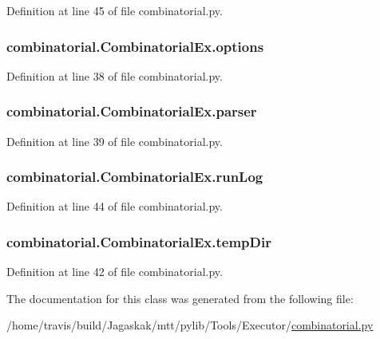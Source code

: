 Definition at line 45 of file combinatorial.\-py.

\hypertarget{classcombinatorial_1_1CombinatorialEx_a20eda525b3947495bb6084c560dcca27}{
\subsubsection[{options}]{\setlength{\rightskip}{0pt plus 5cm}combinatorial.\-Combinatorial\-Ex.\-options}}\label{classcombinatorial_1_1CombinatorialEx_a20eda525b3947495bb6084c560dcca27}


Definition at line 38 of file combinatorial.\-py.

\hypertarget{classcombinatorial_1_1CombinatorialEx_ab5c27fece8991a34f47e85870637fc91}{
\subsubsection[{parser}]{\setlength{\rightskip}{0pt plus 5cm}combinatorial.\-Combinatorial\-Ex.\-parser}}\label{classcombinatorial_1_1CombinatorialEx_ab5c27fece8991a34f47e85870637fc91}


Definition at line 39 of file combinatorial.\-py.

\hypertarget{classcombinatorial_1_1CombinatorialEx_a3de3f7da4c201525da8452258df0bc7b}{
\subsubsection[{run\-Log}]{\setlength{\rightskip}{0pt plus 5cm}combinatorial.\-Combinatorial\-Ex.\-run\-Log}}\label{classcombinatorial_1_1CombinatorialEx_a3de3f7da4c201525da8452258df0bc7b}


Definition at line 44 of file combinatorial.\-py.

\hypertarget{classcombinatorial_1_1CombinatorialEx_a24b3bc621a8380e406bade192bc371d4}{
\subsubsection[{temp\-Dir}]{\setlength{\rightskip}{0pt plus 5cm}combinatorial.\-Combinatorial\-Ex.\-temp\-Dir}}\label{classcombinatorial_1_1CombinatorialEx_a24b3bc621a8380e406bade192bc371d4}


Definition at line 42 of file combinatorial.\-py.



The documentation for this class was generated from the following file\-:\begin{DoxyCompactItemize}
\item 
/home/travis/build/\-Jagaskak/mtt/pylib/\-Tools/\-Executor/\hyperlink{combinatorial_8py}{combinatorial.\-py}\end{DoxyCompactItemize}
